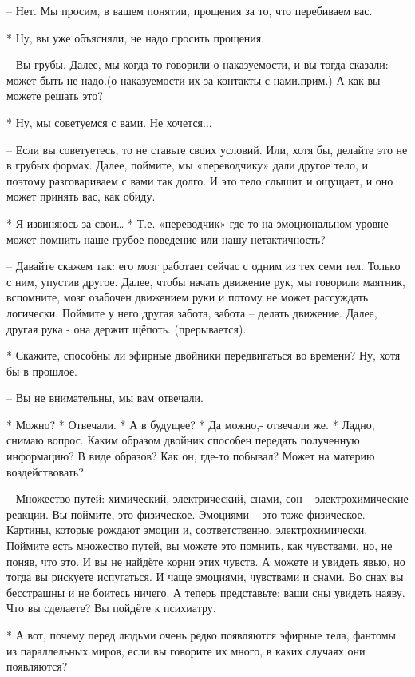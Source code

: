  – Нет. Мы просим, в вашем понятии, прощения за то, что перебиваем вас.

 * Ну, вы уже объясняли, не надо просить прощения.

 – Вы грубы. Далее, мы когда-то говорили о наказуемости, и вы тогда сказали: может быть не надо.(о наказуемости их за контакты с нами.прим.) А как вы можете решать это?

 * Ну, мы советуемся с вами. Не хочется...

 – Если вы советуетесь, то не ставьте своих условий. Или, хотя бы, делайте это не в грубых формах. Далее, поймите, мы «переводчику» дали другое тело, и поэтому разговариваем с вами так долго. И это тело слышит и ощущает, и оно может принять вас, как обиду.

 * Я извиняюсь за свои…
 * Т.е. «переводчик» где-то на эмоциональном уровне может помнить наше грубое поведение или нашу нетактичность?

 – Давайте скажем так: его мозг работает сейчас с одним из тех семи тел. Только с ним, упустив другое. Далее, чтобы начать движение рук, мы говорили маятник, вспомните, мозг озабочен движением руки и потому не может рассуждать логически. Поймите у него другая забота, забота – делать движение. Далее, другая рука -  она держит щёпоть. (прерывается).

 * Скажите, способны ли эфирные двойники передвигаться во времени? Ну, хотя бы в прошлое.

 – Вы не внимательны, мы вам отвечали.

 * Можно? 
 * Отвечали. 
 * А в будущее? 
 * Да можно,- отвечали же.
 * Ладно, снимаю вопрос. Каким образом двойник способен передать полученную информацию? В виде образов? Как он, где-то побывал? Может на материю воздействовать?

 – Множество путей: химический, электрический, снами, сон – электрохимические
 реакции. Вы поймите, это физическое. Эмоциями – это тоже физическое. Картины, которые рождают эмоции и, соответственно, электрохимически. Поймите есть множество путей, вы можете это помнить, как чувствами, но, не поняв, что это. И вы не найдёте корни этих чувств. А можете и увидеть явью, но тогда вы рискуете испугаться. И чаще эмоциями, чувствами и снами. Во снах вы бесстрашны и не боитесь ничего. А теперь представьте: ваши сны увидеть наяву. Что вы сделаете? Вы пойдёте к психиатру.

 * А вот, почему перед людьми очень редко появляются эфирные тела, фантомы из параллельных миров, если вы говорите их много, в каких случаях они появляются?

